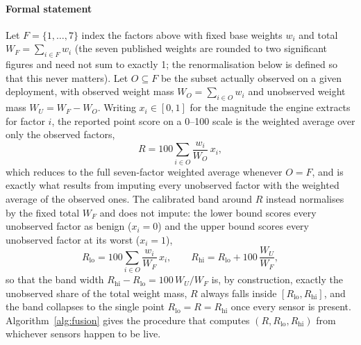 \documentclass[journal]{IEEEtran}
\begin{document}
\paragraph{Formal statement} Let $F=\{1,\dots,7\}$ index the factors above with fixed base weights $w_i$ and total $W_F = \sum_{i\in F} w_i$ (the seven published weights are rounded to two significant figures and need not sum to exactly 1; the renormalisation below is defined so that this never matters). Let $O \subseteq F$ be the subset actually observed on a given deployment, with observed weight mass $W_O = \sum_{i \in O} w_i$ and unobserved weight mass $W_U = W_F - W_O$. Writing $x_i \in [0,1]$ for the magnitude the engine extracts for factor $i$, the reported point score on a 0--100 scale is the weighted average over only the observed factors,
\begin{equation}
R = 100 \sum_{i \in O} \frac{w_i}{W_O}\, x_i,
\label{eq:fusion-point}
\end{equation}
which reduces to the full seven-factor weighted average whenever $O = F$, and is exactly what results from imputing every unobserved factor with the weighted average of the observed ones. The calibrated band around $R$ instead normalises by the fixed total $W_F$ and does not impute: the lower bound scores every unobserved factor as benign ($x_i = 0$) and the upper bound scores every unobserved factor at its worst ($x_i = 1$),
\begin{equation}
R_{\mathrm{lo}} = 100 \sum_{i \in O} \frac{w_i}{W_F}\, x_i, \qquad
R_{\mathrm{hi}} = R_{\mathrm{lo}} + 100\, \frac{W_U}{W_F},
\label{eq:fusion-band}
\end{equation}
so that the band width $R_{\mathrm{hi}} - R_{\mathrm{lo}} = 100\,W_U/W_F$ is, by construction, exactly the unobserved share of the total weight mass, $R$ always falls inside $[R_{\mathrm{lo}}, R_{\mathrm{hi}}]$, and the band collapses to the single point $R_{\mathrm{lo}}=R=R_{\mathrm{hi}}$ once every sensor is present. Algorithm~\ref{alg:fusion} gives the procedure that computes $(R, R_{\mathrm{lo}}, R_{\mathrm{hi}})$ from whichever sensors happen to be live.
\end{document}
